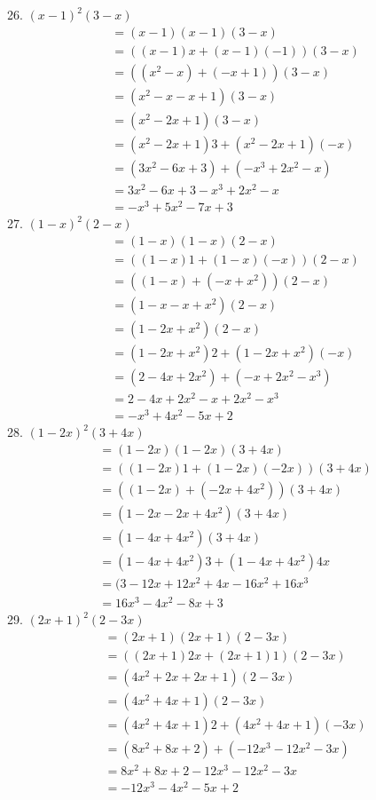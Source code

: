 \documentclass[12pt]{article}
\begin{document}
26. $(x-1)^2(3-x)$
\begin{align*}
&=(x-1)(x-1)(3-x) \\
&=((x-1)x+(x-1)(-1))(3-x) \\
&=((x^2-x)+(-x+1))(3-x) \\
&=(x^2-x-x+1)(3-x) \\
&=(x^2-2x+1)(3-x) \\
&=(x^2-2x+1)3+(x^2-2x+1)(-x) \\
&=(3x^2-6x+3)+(-x^3+2x^2-x) \\
&=3x^2-6x+3-x^3+2x^2-x \\
&=-x^3+5x^2-7x+3
\end{align*}
27. $(1-x)^2(2-x)$
\begin{align*}
&=(1-x)(1-x)(2-x) \\
&=((1-x)1+(1-x)(-x))(2-x) \\
&=((1-x)+(-x+x^2))(2-x) \\
&=(1-x-x+x^2)(2-x) \\
&=(1-2x+x^2)(2-x) \\
&=(1-2x+x^2)2+(1-2x+x^2)(-x) \\
&=(2-4x+2x^2)+(-x+2x^2-x^3) \\
&=2-4x+2x^2-x+2x^2-x^3 \\
&=-x^3+4x^2-5x+2
\end{align*}
28. $(1-2x)^2(3+4x)$
\begin{align*}
&=(1-2x)(1-2x)(3+4x) \\
&=((1-2x)1+(1-2x)(-2x))(3+4x) \\
&=((1-2x)+(-2x+4x^2))(3+4x) \\
&=(1-2x-2x+4x^2)(3+4x) \\
&=(1-4x+4x^2)(3+4x) \\
&=(1-4x+4x^2)3+(1-4x+4x^2)4x \\
&=(3-12x+12x^2+4x-16x^2+16x^3 \\
&=16x^3-4x^2-8x+3
\end{align*}
29. $(2x+1)^2(2-3x)$
\begin{align*}
&=(2x+1)(2x+1)(2-3x) \\
&=((2x+1)2x+(2x+1)1)(2-3x) \\
&=(4x^2+2x+2x+1)(2-3x) \\
&=(4x^2+4x+1)(2-3x) \\
&=(4x^2+4x+1)2+(4x^2+4x+1)(-3x) \\
&=(8x^2+8x+2)+(-12x^3-12x^2-3x) \\
&=8x^2+8x+2-12x^3-12x^2-3x \\
&=-12x^3-4x^2-5x+2
\end{align*}
\end{document}
